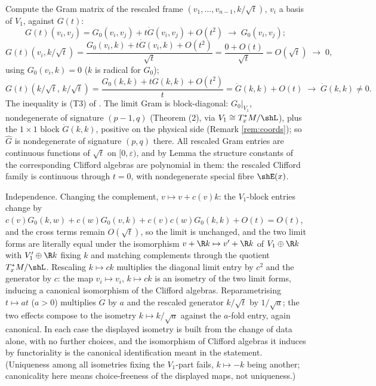 Compute the Gram matrix of the rescaled frame $(v_1, \dots, v_{n-1}, k/\sqrt{t})$, $v_i$ a basis of $V_1$, against $G(t)$:
\[
G(t)(v_i, v_j) = G_0(v_i,v_j) + t\dot G(v_i,v_j) + O(t^2) \;\longrightarrow\; G_0(v_i,v_j) ;
\]
\[
G(t)(v_i, k/\sqrt{t}) = \frac{G_0(v_i,k) + t\dot G(v_i,k) + O(t^2)}{\sqrt{t}} = \frac{0 + O(t)}{\sqrt{t}} = O(\sqrt{t}) \;\longrightarrow\; 0 ,
\]
using $G_0(v_i, k) = 0$ ($k$ is radical for $G_0$);
\[
G(t)(k/\sqrt{t},\, k/\sqrt{t}) = \frac{G_0(k,k) + t\dot G(k,k) + O(t^2)}{t} = \dot G(k,k) + O(t) \;\longrightarrow\; \dot G(k,k) \neq 0 .
\]
The inequality is (T3) of . The limit Gram is block-diagonal: $G_0|_{V_1}$, nondegenerate of signature $(p{-}1,q)$ (Theorem (2), via $V_1 \cong T^*_xM/\shL$), plus the $1 \times 1$ block $\dot G(k,k)$, positive on the physical side (Remark \ref{rem:coords}); so $\hat G$ is nondegenerate of signature $(p,q)$ there. All rescaled Gram entries are continuous functions of $\sqrt{t}$ on $[0, \varepsilon)$, and by Lemma  the structure constants of the corresponding Clifford algebras are polynomial in them: the rescaled Clifford family is continuous through $t = 0$, with nondegenerate special fibre $\shE(x)$.

Independence. Changing the complement, $v \mapsto v + c(v)k$: the $V_1$-block entries change by $c(v)G_0(k, w) + c(w)G_0(v,k) + c(v)c(w)G_0(k,k) + O(t) = O(t)$, and the cross terms remain $O(\sqrt t)$, so the limit is unchanged, and the two limit forms are literally equal under the isomorphism $v + \R k \mapsto v' + \R k$ of $V_1 \oplus \R k$ with $V_1' \oplus \R k$ fixing $k$ and matching complements through the quotient $T^*_xM/\shL$. Rescaling $k \mapsto ck$ multiplies the diagonal limit entry by $c^2$ and the generator by $c$: the map $v_i \mapsto v_i$, $k \mapsto ck$ is an isometry of the two limit forms, inducing a canonical isomorphism of the Clifford algebras. Reparametrising $t \mapsto at$ ($a > 0$) multiplies $\dot G$ by $a$ and the rescaled generator $k/\sqrt{t}$ by $1/\sqrt{a}$; the two effects compose to the isometry $k \mapsto k/\sqrt a$ against the $a$-fold entry, again canonical. In each case the displayed isometry is built from the change of data alone, with no further choices, and the isomorphism of Clifford algebras it induces by functoriality is the canonical identification meant in the statement. (Uniqueness among all isometries fixing the $V_1$-part fails, $k \mapsto -k$ being another; canonicality here means choice-freeness of the displayed maps, not uniqueness.)
